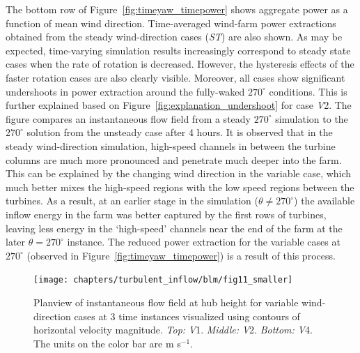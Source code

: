 		The bottom row of Figure~\ref{fig:timeyaw_timepower} shows aggregate power as a function of mean wind direction. Time-averaged wind-farm power extractions obtained from the steady wind-direction cases (\emph{ST}) are also shown. As may be expected, time-varying simulation results increasingly correspond to steady state cases when the rate of rotation is decreased. However, the hysteresis effects of the faster rotation cases are also clearly visible. Moreover, all cases show significant undershoots in power extraction around the fully-waked $270^\circ$ conditions. This is further explained based on Figure~\ref{fig:explanation_undershoot} for case \emph{V}2. The figure compares an instantaneous flow field from a steady $270^\circ$ simulation to the $270^\circ$ solution from the unsteady case after 4 hours. It is observed that in the steady wind-direction simulation, high-speed channels in between the turbine columns are much more pronounced and penetrate much deeper into the farm. This can be explained by the changing wind direction in the variable case, which much better mixes the high-speed regions with the low speed regions between the turbines. As a result, at an earlier stage in the simulation ($\theta \neq 270^\circ$) the available inflow energy in the farm was better captured by the first rows of turbines, leaving less energy in the `high-speed' channels near the end of the farm at the later $\theta=270^\circ$ instance. The reduced power extraction for the variable cases at $270^\circ$ (observed in Figure~\ref{fig:timeyaw_timepower}) is a result of this process.
		
		\begin{figure}[ht]
			\centering
			\texttt{[image: chapters/turbulent\_inflow/blm/fig11\_smaller]}
			\caption[Planview of instantaneous flow field at hub height for variable wind-direction cases at 3 time instances visualized using contours of horizontal velocity magnitude.]{Planview of instantaneous flow field at hub height for variable wind-direction cases at 3 time instances visualized using contours of horizontal velocity magnitude. \emph{Top: } \emph{V}1. \emph{Middle: } \emph{V}2. \emph{Bottom: } \emph{V}4. The units on the color bar are m s$^{-1}$.} 
			\label{fig:topviewfarms}
		\end{figure}
		
